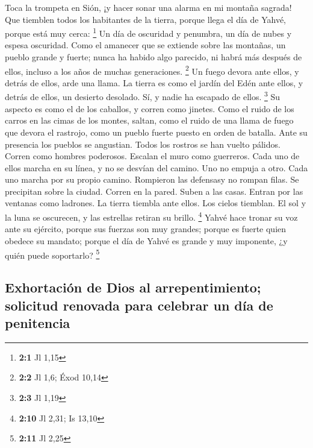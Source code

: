 \begin{paracol}{2}
 Toca la trompeta en Sión, ¡y hacer sonar una alarma en mi
montaña sagrada! Que tiemblen todos los habitantes de la tierra, porque
llega el día de Yahvé, porque está muy cerca: \footnote{\textbf{2:1} Jl
  1,15}  Un día de oscuridad y penumbra, un día de nubes y
espesa oscuridad. Como el amanecer que se extiende sobre las montañas,
un pueblo grande y fuerte; nunca ha habido algo parecido, ni habrá más
después de ellos, incluso a los años de muchas generaciones. \footnote{\textbf{2:2}
  Jl 1,6; Éxod 10,14}  Un fuego devora ante ellos, y
detrás de ellos, arde una llama. La tierra es como el jardín del Edén
ante ellos, y detrás de ellos, un desierto desolado. Sí, y nadie ha
escapado de ellos. \footnote{\textbf{2:3} Jl 1,19}  Su
aspecto es como el de los caballos, y corren como jinetes.
 Como el ruido de los carros en las cimas de los montes,
saltan, como el ruido de una llama de fuego que devora el rastrojo, como
un pueblo fuerte puesto en orden de batalla.  Ante su
presencia los pueblos se angustian. Todos los rostros se han vuelto
pálidos.  Corren como hombres poderosos. Escalan el muro
como guerreros. Cada uno de ellos marcha en su línea, y no se desvían
del camino.  Uno no empuja a otro. Cada uno marcha por su
propio camino. Rompieron las defensasy no rompan filas. 
Se precipitan sobre la ciudad. Corren en la pared. Suben a las casas.
Entran por las ventanas como ladrones.  La tierra tiembla
ante ellos. Los cielos tiemblan. El sol y la luna se oscurecen, y las
estrellas retiran su brillo. \footnote{\textbf{2:10} Jl 2,31; Is 13,10}
 Yahvé hace tronar su voz ante su ejército, porque sus
fuerzas son muy grandes; porque es fuerte quien obedece su mandato;
porque el día de Yahvé es grande y muy imponente, ¿y quién puede
soportarlo? \footnote{\textbf{2:11} Jl 2,25}

\hypertarget{exhortaciuxf3n-de-dios-al-arrepentimiento-solicitud-renovada-para-celebrar-un-duxeda-de-penitencia}{%
\subsection{Exhortación de Dios al arrepentimiento; solicitud renovada
para celebrar un día de
penitencia}\label{exhortaciuxf3n-de-dios-al-arrepentimiento-solicitud-renovada-para-celebrar-un-duxeda-de-penitencia}}


\end{paracol}
